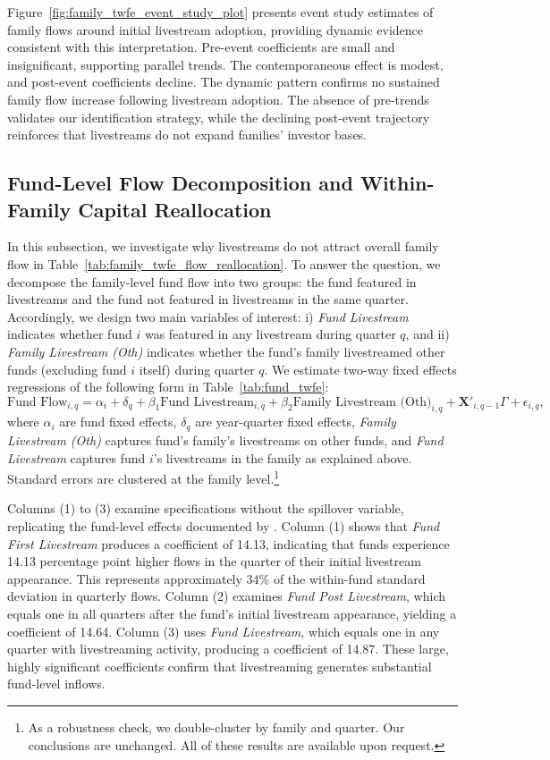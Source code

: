 \documentclass[12pt]{article}
\begin{document}
Figure~\ref{fig:family_twfe_event_study_plot} presents event study estimates of family flows around initial livestream adoption, providing dynamic evidence consistent with this interpretation. Pre-event coefficients are small and insignificant, supporting parallel trends. The contemporaneous effect is modest, and post-event coefficients decline. The dynamic pattern confirms no sustained family flow increase following livestream adoption. The absence of pre-trends validates our identification strategy, while the declining post-event trajectory reinforces that livestreams do not expand families' investor bases.

\subsection{Fund-Level Flow Decomposition and Within-Family Capital Reallocation}
In this subsection, we investigate why livestreams do not attract overall family flow in Table~\ref{tab:family_twfe_flow_reallocation}. To answer the question, we decompose the family-level fund flow into two groups: the fund featured in livestreams and the fund not featured in livestreams in the same quarter. Accordingly, we design two main variables of interest: i) \textit{Fund Livestream} indicates whether fund $i$ was featured in any livestream during quarter $q$, and ii) \textit{Family Livestream (Oth)} indicates whether the fund's family livestreamed other funds (excluding fund $i$ itself) during quarter $q$. We estimate two-way fixed effects regressions of the following form in Table~\ref{tab:fund_twfe}: %
\begin{equation}
    \label{eq:fund_flow_appendix}
    \text{Fund Flow}_{i,q} = \alpha_i + \delta_q + \beta_1  \text{Fund Livestream}_{i,q} + \beta_2 \text{Family Livestream (Oth)}_{i,q} + \mathbf{X}'_{i,q-1} \Gamma + \epsilon_{i,q},
\end{equation}
where $\alpha_i$ are fund fixed effects, $\delta_q$ are year-quarter fixed effects, \textit{Family Livestream (Oth)} captures fund's family's livestreams on other funds, and \textit{Fund Livestream} captures fund $i$'s livestreams in the family as explained above. Standard errors are clustered at the family level.\footnote{As a robustness check, we double-cluster by family and quarter. Our conclusions are unchanged. All of these results are available upon request.}

Columns (1) to (3) examine specifications without the spillover variable, replicating the fund-level effects documented by \citet{dehaan2025social}. Column (1) shows that \textit{Fund First Livestream} produces a coefficient of 14.13, indicating that funds experience 14.13 percentage point higher flows in the quarter of their initial livestream appearance. This represents approximately 34\% of the within-fund standard deviation in quarterly flows. Column (2) examines \textit{Fund Post Livestream}, which equals one in all quarters after the fund's initial livestream appearance, yielding a coefficient of 14.64. Column (3) uses \textit{Fund Livestream}, which equals one in any quarter with livestreaming activity, producing a coefficient of 14.87. These large, highly significant coefficients confirm that livestreaming generates substantial fund-level inflows.
\end{document}
